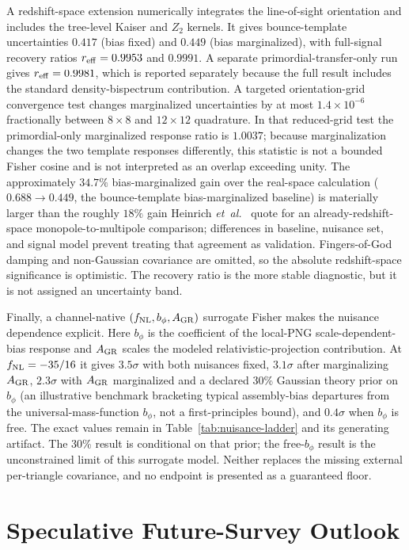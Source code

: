 \documentclass[aps,prd,twocolumn,superscriptaddress,showpacs,preprintnumbers,nofootinbib,longbibliography,floatfix]{revtex4-2}
\newcommand{\fnl}{f_{\rm NL}}
\newcommand{\etal}{\textit{et~al.}}
\begin{document}
A redshift-space extension numerically integrates the line-of-sight orientation and includes the tree-level Kaiser and $Z_2$ kernels. It gives bounce-template uncertainties $0.417$ (bias fixed) and $0.449$ (bias marginalized), with full-signal recovery ratios $r_{\rm eff}=0.9953$ and $0.9991$. A separate primordial-transfer-only run gives $r_{\rm eff}=0.9981$, which is reported separately because the full result includes the standard density-bispectrum contribution. A targeted orientation-grid convergence test changes marginalized uncertainties by at most $1.4\times10^{-6}$ fractionally between $8\times8$ and $12\times12$ quadrature. In that reduced-grid test the primordial-only marginalized response ratio is $1.0037$; because marginalization changes the two template responses differently, this statistic is not a bounded Fisher cosine and is not interpreted as an overlap exceeding unity. The approximately $34.7\%$ bias-marginalized gain over the real-space calculation ($0.688\to0.449$, the bounce-template bias-marginalized baseline) is materially larger than the roughly $18\%$ gain Heinrich \etal~\cite{Heinrich:2023} quote for an already-redshift-space monopole-to-multipole comparison; differences in baseline, nuisance set, and signal model prevent treating that agreement as validation. Fingers-of-God damping and non-Gaussian covariance are omitted, so the absolute redshift-space significance is optimistic. The recovery ratio is the more stable diagnostic, but it is not assigned an uncertainty band.

Finally, a channel-native $(\fnl,b_\phi,A_{\rm GR})$ surrogate Fisher makes the nuisance dependence explicit. Here $b_\phi$ is the coefficient of the local-PNG scale-dependent-bias response and $A_{\rm GR}$ scales the modeled relativistic-projection contribution. At $\fnl=-35/16$ it gives $3.5\sigma$ with both nuisances fixed, $3.1\sigma$ after marginalizing $A_{\rm GR}$, $2.3\sigma$ with $A_{\rm GR}$ marginalized and a declared 30\% Gaussian theory prior on $b_\phi$ (an illustrative benchmark bracketing typical assembly-bias departures from the universal-mass-function $b_\phi$, not a first-principles bound), and $0.4\sigma$ when $b_\phi$ is free. The exact values remain in Table~\ref{tab:nuisance-ladder} and its generating artifact. The 30\% result is conditional on that prior; the free-$b_\phi$ result is the unconstrained limit of this surrogate model. Neither replaces the missing external per-triangle covariance, and no endpoint is presented as a guaranteed floor.
\section{Speculative Future-Survey Outlook}
\label{sec:megamapper}
\end{document}
